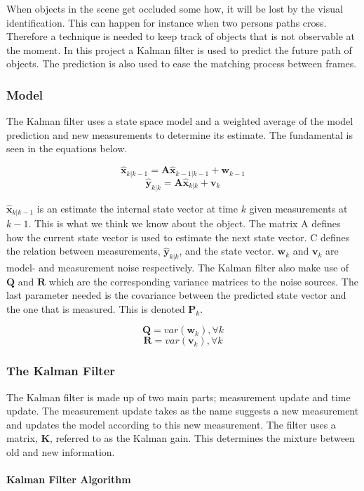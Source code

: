 When objects in the scene get occluded some how, it will be lost by the visual identification. This can happen for instance when two persons paths cross. Therefore a technique is needed to keep track of objects that is not observable at the moment. In this project a Kalman filter is used to predict the future path of objects. The prediction is also used to ease the matching process between frames. 

\subsubsection{Model}
The Kalman filter uses a state space model and a weighted average of the model prediction and new measurements to determine its estimate. The fundamental is seen in the equations below.


$$
\hat{\textbf{x}}_{k|k-1} = \textbf{A}\hat{\textbf{x}}_{k-1|k-1} +  \textbf{w}_{k-1}  
$$
$$
\hat{\textbf{y}}_{k|k} = \textbf{A}\hat{\textbf{x}}_{k|k} +  \textbf{v}_{k}
$$
	
$\hat{\textbf{x}}_{k|k-1}$ is an estimate the internal state vector at time $k$ given measurements at $k-1$. This is what we think we know about the object. The matrix A defines how the current state vector is used to estimate the next state vector. C defines the relation between measurements, $\hat{\textbf{y}}_{k|k}$, and the state vector. $\textbf{w}_{k}$ and $\textbf{v}_{k}$ are model- and measurement noise respectively. The Kalman filter also make use of $\textbf{Q}$ and $\textbf{R}$ which are the corresponding variance matrices to the noise sources. The last parameter needed is the covariance between the predicted state vector and the one that is measured. This is denoted $\textbf{P}_{k}$.

$$
\textbf{Q} = var(\textbf{w}_k), \forall k
$$
$$
\textbf{R} = var(\textbf{v}_k), \forall k
$$



\subsubsection{The Kalman Filter}
The Kalman filter is made up of two main parts; measurement update and time update. The measurement update takes as the name suggests a new measurement and updates the model according to this new measurement. The filter uses a matrix, $\textbf{K}$, referred to as the Kalman gain. This determines the mixture between old and new information.

\paragraph{Kalman Filter Algorithm}	

